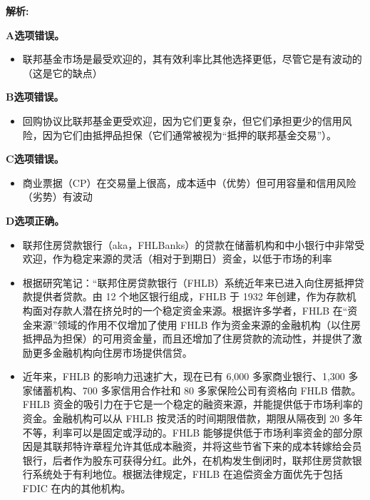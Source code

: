 \documentclass{article}
\newenvironment{explanation}
{\textbf{解析:}\par}
{\par}
\begin{document}
\begin{explanation}
    \textbf{A选项错误。}
    \begin{itemize}
        \item 联邦基金市场是最受欢迎的，其有效利率比其他选择更低，尽管它是有波动的（这是它的缺点）
    \end{itemize}

    \textbf{B选项错误。}
    \begin{itemize}
        \item 回购协议比联邦基金更受欢迎，因为它们更复杂，但它们承担更少的信用风险，因为它们由抵押品担保（它们通常被视为“抵押的联邦基金交易”）。
    \end{itemize}

    \textbf{C选项错误。}
    \begin{itemize}
        \item 商业票据（CP）在交易量上很高，成本适中（优势）但可用容量和信用风险（劣势）有波动
    \end{itemize}

    \textbf{D选项正确。}
    \begin{itemize}
        \item 联邦住房贷款银行（aka，FHLBanks）的贷款在储蓄机构和中小银行中非常受欢迎，作为稳定来源的灵活（相对于到期日）资金，以低于市场的利率
 
        \item 根据研究笔记：“联邦住房贷款银行（FHLB）系统近年来已进入向住房抵押贷款提供者贷款。由 12 个地区银行组成，FHLB 于 1932 年创建，作为存款机构面对存款人潜在挤兑时的一个稳定资金来源。根据许多学者，FHLB 在“资金来源”领域的作用不仅增加了使用 FHLB 作为资金来源的金融机构（以住房抵押品为担保）的可用资金量，而且还增加了住房贷款的流动性，并提供了激励更多金融机构向住房市场提供信贷。

        \item 近年来，FHLB 的影响力迅速扩大，现在已有 6,000 多家商业银行、1,300 多家储蓄机构、700 多家信用合作社和 80 多家保险公司有资格向 FHLB 借款。FHLB 资金的吸引力在于它是一个稳定的融资来源，并能提供低于市场利率的资金。金融机构可以从 FHLB 按灵活的时间期限借款，期限从隔夜到 20 多年不等，利率可以是固定或浮动的。FHLB 能够提供低于市场利率资金的部分原因是其联邦特许章程允许其低成本融资，并将这些节省下来的成本转嫁给会员银行，后者作为股东可获得分红。此外，在机构发生倒闭时，联邦住房贷款银行系统处于有利地位。根据法律规定，FHLB 在追偿资金方面优先于包括 FDIC 在内的其他机构。
    \end{itemize}
\end{explanation}
\end{document}
